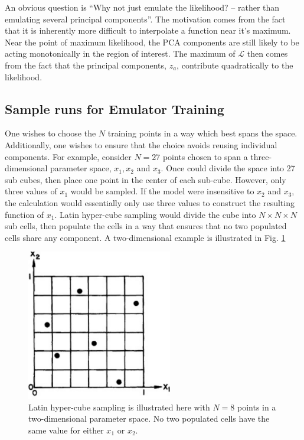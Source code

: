An obvious question is ``Why not just emulate the likelihood? -- rather than emulating several principal components''. The motivation comes from the fact that it is inherently more difficult to interpolate a function near it's maximum. Near the point of maximum likelihood, the PCA components are still likely to be acting monotonically in the region of interest. The maximum of ${\mathcal L}$ then comes from the fact that the principal components, $z_a$, contribute quadratically to the likelihood.

\subsection{Sample runs for Emulator Training}
One wishes to choose the $N$ training points in a way which best spans the space. Additionally, one wishes to ensure that the choice avoids reusing individual components. For example, consider $N=27$ points chosen to span a three-dimensional parameter space, $x_1,x_2$ and $x_3$. Once could divide the space into 27 sub cubes, then place one point in the center of each sub-cube. However, only three values of $x_1$ would be sampled. If the model were insensitive to $x_2$ and $x_3$, the calculation would essentially only use three values to construct the resulting function of $x_1$. Latin hyper-cube sampling would divide the cube into $N\times N\times N$ sub cells, then populate the cells in a way that ensures that no two populated cells share any component. A two-dimensional example is illustrated in Fig. \ref{fig:hypercube}

\noindent
\begin{figure}
\includegraphics[width=2.5in]{figs/hypercube}
\parbox[b]{4.5in}
{\caption{\label{fig:hypercube}
Latin hyper-cube sampling is illustrated here with $N=8$ points in a two-dimensional parameter space. No two populated cells have the same value for either $x_1$ or $x_2$.}
\vspace*{60pt}
}

\end{figure}

